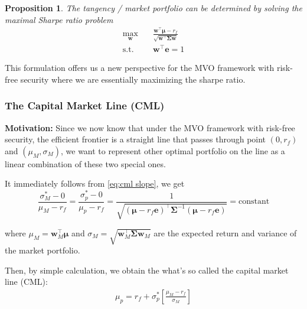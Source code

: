 \documentclass[13pt]{article}
\newtheorem{proposition}[theorem]{Proposition}
\theoremstyle{definition}
\theoremstyle{remark}
\newenvironment{remark}
  {\pushQED{\qed}\renewcommand{\qedsymbol}{$\triangle$}\remarkx}
  {\popQED\endremarkx}
\begin{document}
\begin{proposition}\label{prop: market portfolio maximize sharpe}The tangency / market portfolio can be determined by solving the maximal Sharpe ratio problem
\begin{align*}
    \max_{\bm{w}} \quad & \frac{\bm{w}^{\top} \bm{\mu}-r_{f}}{\sqrt{\bm{w}^{\top} \mathbf{\Sigma} \bm{w}}} \\
    \text {s.t.} \quad   & \bm{w}^{\top} \bm{e}=1
\end{align*}
\end{proposition}


\begin{remark}This formulation offers us a new perspective for the MVO framework with risk-free security where we are essentially maximizing the sharpe ratio.

\end{remark}

\subsubsection{The Capital Market Line (CML)}\label{sec:The Capital Market Line (CML)}
{\color{C6}\textbf{Motivation:} Since we now know that under the MVO framework with risk-free security, the efficient frontier is a straight line that passes through point $(0, r_f)$ and $(\mu_M, \sigma_M)$, we want to represent other optimal portfolio on the line as a linear combination of these two special ones.}

It immediately follows from \cref{eq:cml slope}, we get
\[
\frac{\sigma_{M}^{*}-0}{\mu_{M} - r_f} = \frac{\sigma_{p}^{*}-0}{\mu_{p} - r_f} = \frac{1}{\sqrt{\left(\bm{\mu}-r_{f} \bm{e}\right)^{\top} \mathbf{\Sigma}^{-1}\left(\bm{\mu}-r_{f} \bm{e}\right)}} = \text{constant}
\]

where $\mu_{M}=\bm{w}_{M}^{\top} \bm{\mu}$ and $\sigma_{M}=\sqrt{\bm{w}_{M}^{\top} \mathbf{\Sigma} \bm{w}_{M}}$ are the expected return and variance of the market portfolio.

Then, by simple calculation, we obtain the what's so called the capital market line (CML): 
\begin{align}
\mu_{p}=r_{f}+\sigma_{p}^*\left[\frac{\mu_{M}-r_{f}}{\sigma_{M}}\right]\label{eq:cml}
\end{align}
\end{document}
